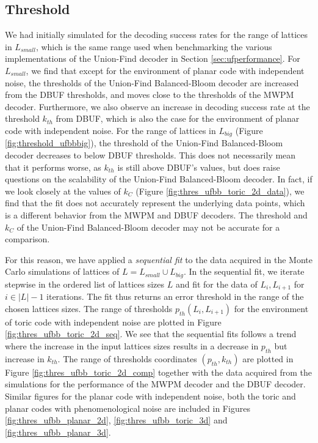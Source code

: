\subsection{Threshold}

We had initially simulated for the decoding success rates for the range of lattices in $L_{small}$, which is the same range used when benchmarking the various implementations of the Union-Find decoder in Section \ref{sec:ufperformance}. For $L_{small}$, we find that except for the environment of planar code with independent noise, the thresholds of the Union-Find Balanced-Bloom decoder are increased from the DBUF thresholds, and moves close to the thresholds of the MWPM decoder. Furthermore, we also observe an increase in decoding success rate at the threshold $k_{th}$ from DBUF, which is also the case for the environment of planar code with independent noise. For the range of lattices in $L_{big}$ (Figure \ref{fig:threshold_ufbbbig}), the threshold of the Union-Find Balanced-Bloom decoder decreases to below DBUF thresholds. This does not necessarily mean that it performs worse, as $k_{th}$ is still above DBUF's values, but does raise questions on the scalability of the Union-Find Balanced-Bloom decoder. In fact, if we look closely at the values of $k_C$ (Figure \ref{fig:thres_ufbb_toric_2d_data}), we find that the fit does not accurately represent the underlying data points, which is a different behavior from the MWPM and DBUF decoders. The threshold and $k_C$ of the Union-Find Balanced-Bloom decoder may not be accurate for a comparison. 

For this reason, we have applied a \emph{sequential fit} to the data acquired in the Monte Carlo simulations of lattices of $L = L_{small} \cup L_{big}$. In the sequential fit, we iterate stepwise in the ordered list of lattices sizes $L$ and fit for the data of $L_i, L_{i+1}$ for $i \in |L|-1$ iterations. The fit thus returns an error threshold in the range of the chosen lattices sizes. The range of thresholds $p_{th}(L_i, L_{i+1})$ for the environment of toric code with independent noise are plotted in Figure \ref{fig:thres_ufbb_toric_2d_seq}. We see that the sequential fits follows a trend where the increase in the input lattices sizes results in a decrease in $p_{th}$ but increase in $k_{th}$. The range of thresholds coordinates $(p_{th}, k_{th})$ are plotted in Figure \ref{fig:thres_ufbb_toric_2d_comp} together with the data acquired from the simulations for the performance of the MWPM decoder and the DBUF decoder. Similar figures for the planar code with independent noise, both the toric and planar codes with phenomenological noise are included in Figures \ref{fig:thres_ufbb_planar_2d}, \ref{fig:thres_ufbb_toric_3d} and \ref{fig:thres_ufbb_planar_3d}. 

